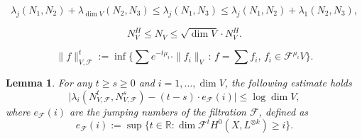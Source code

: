 \documentclass[10pt,a4paper]{amsart}
\newtheorem{lem}{Lemma}
\newcommand{\real}{\mathbb{R}}
\begin{document}
	\begin{equation}\label{eq_log_rel_spec02}
		\lambda_j(N_1, N_2) + \lambda_{\dim V}(N_2, N_3) \leq \lambda_j(N_1, N_3) \leq \lambda_j(N_1, N_2) + \lambda_1(N_2, N_3),
	\end{equation}

	\begin{equation}\label{eq_john_ellips}
		N_V^H \leq N_V \leq \sqrt{\dim V} \cdot N_V^H.
	\end{equation}

	\begin{equation}\label{eq_ray_norm_defn0}
		\| f \|_{V, \mathcal{F}}^t :=
		\inf 
		\Big\{
			\sum
			e^{- t \mu_i} \cdot 
			\| f_i \|_V
			\,
			:
			\,
			f = \sum f_i, \, f_i \in \mathcal{F}^{\mu_i} V
		\Big\}.
	\end{equation}

	\begin{lem}\label{lem_log_spec_ray}
		For any $t \geq s \geq 0$ and $i = 1, \ldots, \dim V$, the following estimate holds
		\begin{equation}
			\Big| \lambda_i(N_{V, \mathcal{F}}^t, N_{V, \mathcal{F}}^s) - (t - s) \cdot e_{\mathcal{F}}(i) \Big|
			\leq
			\log \dim V,
		\end{equation}
		where $e_{\mathcal{F}}(i)$ are the jumping numbers of the filtration $\mathcal{F}$, defined as
		\begin{equation}\label{eq_defn_jump_numborig}
			e_{\mathcal{F}}(i) := \sup \Big\{ t \in \real : \dim \mathcal{F}^t H^0(X, L^{\otimes k}) \geq i \Big\}.
		\end{equation}
	\end{lem}
\end{document}
